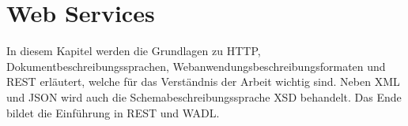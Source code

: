 \chapter{Web Services}
\label{sec:web_services}


In diesem Kapitel werden die Grundlagen zu HTTP, Dokumentbeschreibungssprachen, Webanwendungsbeschreibungsformaten und \gls{REST} erläutert, welche für das Verständnis der Arbeit wichtig sind. 
Neben \gls{XML} und  \gls{JSON} wird auch die Schemabeschreibungssprache \gls{XSD} behandelt.
Das Ende bildet die Einführung in \gls{REST} und \gls{WADL}.









